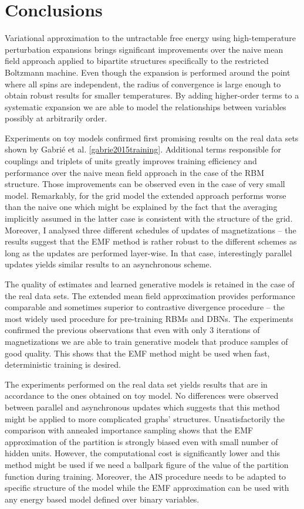 \chapter*{Conclusions}
Variational approximation to the untractable free energy using high-temperature perturbation expansions brings significant improvements over the naive mean field approach applied to bipartite structures specifically to the restricted Boltzmann machine. Even though the expansion is performed around the point where all spins are independent, the radius of convergence is large enough to obtain robust results for smaller temperatures. By adding higher-order terms to a systematic expansion we are able to model the relationships between variables possibly at arbitrarily order.

Experiments on toy models confirmed first promising results on the real data sets shown by Gabri{\'e} et al. \ref{gabrie2015training}. Additional terms responsible for couplings and triplets of units greatly improves training efficiency and performance over the naive mean field approach in the case of the RBM structure. Those improvements can be observed even in the case of very small model. Remarkably, for the grid model the extended approach performs worse than the naive one which might be explained by the fact that the averaging implicitly assumed in the latter case is consistent with the structure of the grid. Moreover, I analysed three different schedules of updates of magnetizations -- the results suggest that the EMF method is rather robust to the different schemes as long as the updates are performed layer-wise. In that case, interestingly parallel updates yields similar results to an asynchronous scheme.

The quality of estimates and learned generative models is retained in the case of the real data sets. The extended mean field approximation provides performance comparable and sometimes superior to contrastive divergence procedure -- the most widely used procedure for pre-training RBMs and DBNs. The experiments confirmed the previous observations that even with only $3$ iterations of magnetizations we are able to train generative models that produce samples of good quality. This shows that the EMF method might be used when fast, deterministic training is desired.

The experiments performed on the real data set yields results that are in accordance to the ones obtained on toy model. No differences were observed between parallel and asynchronous updates which suggests that this method might be applied to more complicated graphs' structures. Unsatisfactorily the comparison with annealed importance sampling shows that the EMF approximation of the partition is strongly biased even with small number of hidden units. However, the computational cost is significantly lower and  this method might be used if we need a ballpark figure of the value of the partition function during training. Moreover, the AIS procedure needs to be adapted to specific structure of the model while the EMF approximation can be used with any energy based model defined over binary variables.

